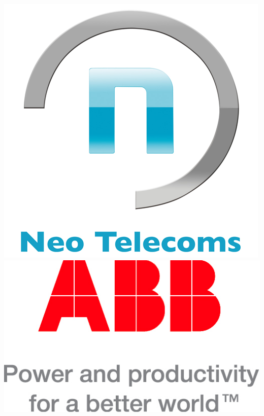 \begin{frame}[c]
   \includegraphics[scale=0.125]{plots/pictures/Xavier/neo-telecoms.jpg}
   \hspace{2cm}
   \includegraphics[scale=0.5]{plots/pictures/Xavier/ABB.jpg}

\end{frame}

